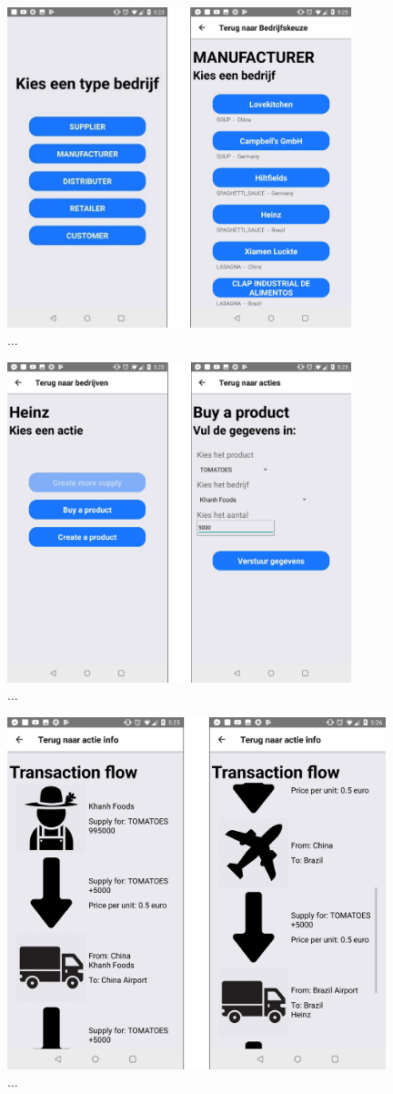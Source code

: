 \begin{center}
	\includegraphics[width=10cm]{img/react-demo-2-1}\\[1cm]
	...
\end{center}
\begin{center}
	\includegraphics[width=10cm]{img/react-demo-2-2}\\[1cm]
	...
\end{center}
\begin{center}
	\includegraphics[width=11cm]{img/react-demo-2-3}\\[1cm]
	...
\end{center}
